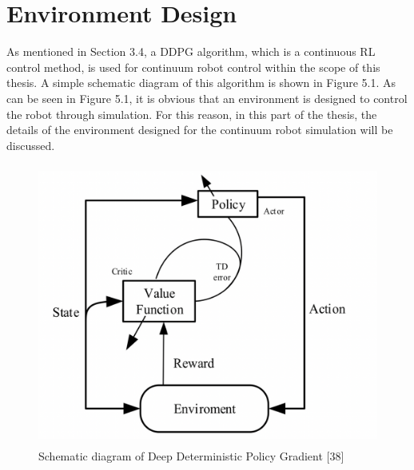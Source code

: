 \documentclass[12pt,twoside,a4]{mwbk}
\begin{document}
\chapter{Environment Design}
As mentioned in Section 3.4, a DDPG algorithm, which is a continuous RL control method, is used for continuum robot control within the scope of this thesis. A simple schematic diagram of this algorithm is shown in Figure 5.1. As can be seen in Figure 5.1, it is obvious that an environment is designed to control the robot through simulation. For this reason, in this part of the thesis, the details of the environment designed for the continuum robot simulation will be discussed.
\begin{figure}[h]
    \centering
    \includegraphics[width=11.7cm, height=9.3cm]{DDPG.png}
    \caption{Schematic diagram of Deep Deterministic Policy Gradient [38]}
\end{figure}
\end{document}
